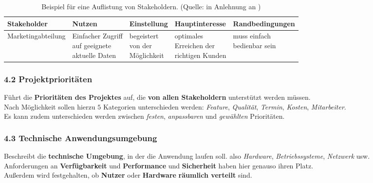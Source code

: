 \begin{table}
[htbp]
    \centering
    \begin{tabular}{|l|l|l|l|l|}
        \hline
        \textbf{Stakeholder} & \textbf{Nutzen} & \textbf{Einstellung} & \textbf{Hauptinteresse} & \textbf{Randbedingungen}   \\
        \hline
        Marketingabteilung & \makecell{Einfacher Zugriff\\auf geeignete\\aktuelle Daten} & \makecell{begeistert\\von der\\Möglichkeit} & \makecell{optimales\\Erreichen der\\richtigen Kunden} & \makecell{muss einfach\\bedienbar sein} \\
        \hline
    \end{tabular}
    \caption{Beispiel für eine Auflistung von Stakeholdern. (Quelle: in Anlehnung an \cite[85]{Wed09})}\label{tab:stakeholder}
\end{table}




\subsubsection*{4.2 Projektprioritäten}
Führt die \textbf{Prioritäten des Projektes} auf, die \textbf{von allen Stakeholdern} unterstützt werden müssen.\\
Nach Möglichkeit sollen hierzu $5$ Kategorien unterschieden werden: \textit{Feature}, \textit{Qualität}, \textit{Termin},
\textit{Kosten}, \textit{Mitarbeiter}. \\
Es kann zudem unterschieden werden zwischen \textit{festen}, \textit{anpassbaren} und \textit{gewählten} Prioritäten.\\

\subsubsection*{4.3 Technische Anwendungsumgebung}
Beschreibt die \textbf{technische Umgebung}, in der die Anwendung laufen soll. also \textit{Hardware}, \textit{Betriebssysteme}, \textit{Netzwerk} usw.\\
Anforderungen an \textbf{Verfügbarkeit} und \textbf{Performance} und \textbf{Sicherheit} haben hier genauso ihren Platz.\\
Außerdem wird festgehalten, ob \textbf{Nutzer} oder \textbf{Hardware} \textbf{räumlich verteilt} sind.